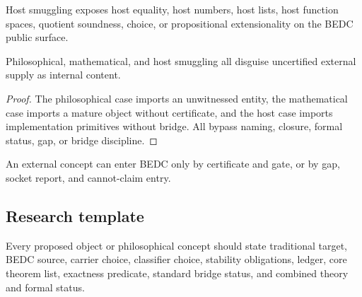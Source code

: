 \begin{definition}
\label{def:philosophy-host-smuggling}
Host smuggling exposes host equality, host numbers, host lists, host
function spaces, quotient soundness, choice, or propositional
extensionality on the BEDC public surface.
\end{definition}

\begin{theorem}
\label{thm:philosophy-three-smuggling-forms-one-shape}
Philosophical, mathematical, and host smuggling all disguise
uncertified external supply as internal content.
\end{theorem}
\begin{proof}
The philosophical case imports an unwitnessed entity, the mathematical
case imports a mature object without certificate, and the host case
imports implementation primitives without bridge. All bypass naming,
closure, formal status, gap, or bridge discipline.
\end{proof}

\begin{corollary}
\label{cor:philosophy-external-concepts-two-routes}
An external concept can enter BEDC only by certificate and gate, or by
gap, socket report, and cannot-claim entry.
\end{corollary}



\subsection{Research template}
\label{subsec:philosophy-research-template}

\begin{definition}
\label{def:philosophy-ten-field-research-template}
Every proposed object or philosophical concept should state traditional
target, BEDC source, carrier choice, classifier choice, stability
obligations, ledger, core theorem list, exactness predicate, standard
bridge status, and combined theory and formal status.
\end{definition}

